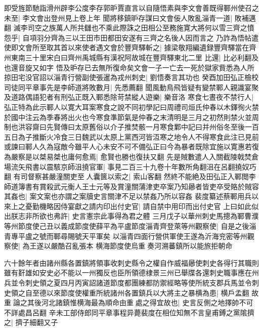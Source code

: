 即受旌節馳詣滑州辟李公度李存郭昈賈直言以自隨悟素與李文會善既得鄆州使召之未至|{
	李文會出登州見上卷上年}
聞將移鎮昈存謀曰文會佞人敗亂淄青一道|{
	敗補邁翻}
滅李司空之族萬人所共讎也不乘此際誅之田相公至務施寛大將何以雪三齊之憤怨乎|{
	自項羽分齊為三以王田市田都田安遂有三齊之名後人因而言之}
乃詐為悟帖遣使即文會所至取其首以來使者遇文會於豐齊驛斬之|{
	據梁敬翔編遺録豐齊驛當在齊州東南三十里宋白曰齊州禹城縣有漢祝阿故城在豐齊驛東北二里}
比還|{
	比必利翻及也還音旋又如字}
悟及昈存已去無所復命矣文會一子一亡去一死於獄家貲悉為人所掠田宅没官詔以淄青行營副使張暹為戎州刺史|{
	劉悟奏言其功也}
癸酉加田弘正檢校司徒同平章事先是李師道將敗數月|{
	先悉薦翻}
聞風動鳥飛皆疑有變禁鄆人親識宴聚及道路偶語犯者有刑弘正既入鄆悉除苛禁縱人遊樂|{
	樂音洛}
寒食七晝夜不禁行人|{
	弘正特為此示鄆人以寛大耳案寒食之說不同初學記曰周禮司烜氏仲春以木鐸徇火禁於國中注云為季春將出火也今寒食準節氣是仲春之末清明是三月之初然則禁火並周制也洪容齋曰先賢傳曰太原舊俗以介子推焚骸一月寒食鄴中記曰并州俗冬至後一百五日為子推斷火冷食三日魏武以太原上黨西河皆沍寒之地令人不得寒食此注已見前}
或諫曰鄆人久為寇敵今雖平人心未安不可不備弘正曰今為暴者既除宜施以寛惠若復為嚴察是以桀易桀也庸何愈焉|{
	愈賢也勝也復扶又翻}
先是賊數遣人入關截陵戟焚倉場流矢飛書以震駭京師沮撓官軍|{
	事見二百三十九卷十年數所角翻沮在呂翻撓奴巧翻}
有司督察甚嚴潼關吏至人囊篋以索之|{
	索山客翻}
然終不能絶及田弘正入鄆閲李師道簿書有賞殺武元衡人王士元等及賞潼關蒲津吏卒案乃知曏者皆吏卒受賂於賊容其姦也|{
	案文案也亦謂之案牘史言關津不足以禁姦乃所以容姦}
裴度纂述蔡鄆用兵以來上之憂勤機略因侍宴獻之請内印出付史官|{
	請自禁中用印而出付史官}
上曰如此似出朕志非所欲也弗許|{
	史言憲宗此事得為君之體}
三月戊子以華州刺史馬摠為鄆曹濮等州節度使己丑以義成節度使薛平為平盧節度淄青齊登萊等州觀察使|{
	自是之後淄青專平盧之號而鄆尋賜號天平軍矣}
以淄青四面行營供軍使王遂為沂海兖密等州觀察使|{
	為王遂以嚴酷召亂張本}
横海節度使烏重奏河溯蕃鎮所以能旅拒朝命

六十餘年者由諸州縣各置鎮將領事收刺史縣令之權自作威福曏使刺史各得行其職則雖有姧雄如安史必不能以一州獨反也臣所領德棣景三州已舉牒各還刺史職事應在州兵並令刺史領之夏四月丙寅詔諸道節度都團練都防禦經略等使所統支郡兵馬並令刺史領之自至德以來節度使權重所統諸州各置鎮兵以大將主之暴横為患|{
	横戶孟翻}
故重論之其後河北諸鎮惟横海最為順命由重處之得宜故也|{
	史言反側之地擇帥不可不詳處昌呂翻}
辛未工部侍郎同平章事程异薨裴度在相位知無不言皇甫鎛之黨隂擠之|{
	擠子細翻又子}


